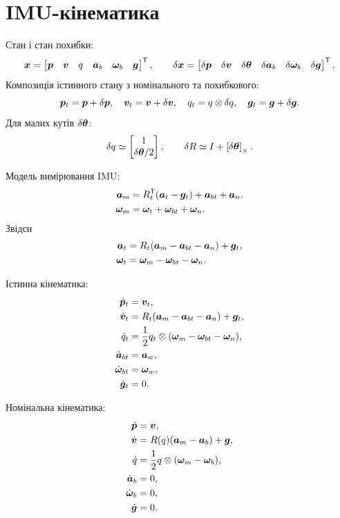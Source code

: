 \section{IMU-кінематика}

Стан і стан похибки:
\[
\bm{x}=\begin{bmatrix}\bm{p}&\bm{v}&q&\bm{a}_b&\bm{\omega}_b&\bm{g}\end{bmatrix}^{\mathsf{T}},
\qquad
\delta\bm{x}=\begin{bmatrix}\delta\bm{p}&\delta\bm{v}&\delta\bm{\theta}&\delta\bm{a}_b&\delta\bm{\omega}_b&\delta\bm{g}\end{bmatrix}^{\mathsf{T}}.
\]
Композиція істинного стану з номінального та похибкового:
\[
\bm{p}_t=\bm{p}+\delta\bm{p},
\quad
\bm{v}_t=\bm{v}+\delta\bm{v},
\quad
q_t=q\otimes\delta q,
\quad
\bm{g}_t=\bm{g}+\delta\bm{g}.
\]
Для малих кутів $\delta\bm{\theta}$:
\[
\delta q\simeq \begin{bmatrix}1\\ \delta\bm{\theta}/2\end{bmatrix},
\qquad
\delta R\simeq I+\left[\delta\bm{\theta}\right]_{\times}.
\]

Модель вимірювання IMU:
\begin{align}
\bm{a}_m &= R_t^{\mathsf{T}}(\bm{a}_t-\bm{g}_t)+\bm{a}_{bt}+\bm{a}_n,\\
\bm{\omega}_m &= \bm{\omega}_t+\bm{\omega}_{bt}+\bm{\omega}_n.
\end{align}
Звідси
\begin{align}
\bm{a}_t &= R_t(\bm{a}_m-\bm{a}_{bt}-\bm{a}_n)+\bm{g}_t,\\
\bm{\omega}_t &= \bm{\omega}_m-\bm{\omega}_{bt}-\bm{\omega}_n.
\end{align}

Істинна кінематика:
\begin{align}
\dot{\bm{p}}_t &= \bm{v}_t,\\
\dot{\bm{v}}_t &= R_t(\bm{a}_m-\bm{a}_{bt}-\bm{a}_n)+\bm{g}_t,\\
\dot{q}_t &= \frac{1}{2}q_t\otimes(\bm{\omega}_m-\bm{\omega}_{bt}-\bm{\omega}_n),\\
\dot{\bm{a}}_{bt} &= \bm{a}_w,\\
\dot{\bm{\omega}}_{bt} &= \bm{\omega}_w,\\
\dot{\bm{g}}_t &= 0.
\end{align}

Номінальна кінематика:
\begin{align}
\dot{\bm{p}} &= \bm{v},\\
\dot{\bm{v}} &= R(q)(\bm{a}_m-\bm{a}_b)+\bm{g},\\
\dot{q} &= \frac{1}{2}q\otimes(\bm{\omega}_m-\bm{\omega}_b),\\
\dot{\bm{a}}_b &= 0,\\
\dot{\bm{\omega}}_b &= 0,\\
\dot{\bm{g}} &= 0.
\end{align}

